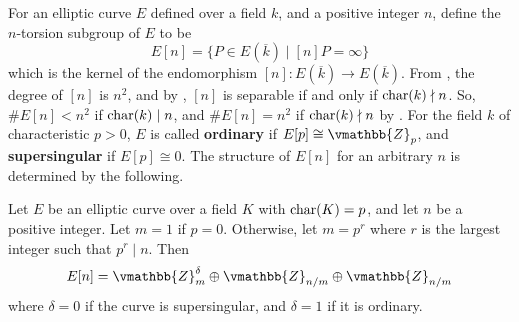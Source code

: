 For an elliptic curve $E$ defined over a field $k$, and a positive integer $n$, define the 
$n$-torsion subgroup of $E$ to be
$$
E[n] = \{ P \in E(\overline{k}) \mid [n]P = \infty\}
$$
which is the kernel of the endomorphism $[n]: E(\overline{k}) \rightarrow E(\overline{k})$. From 
, the degree of $[n]$ is $n^2$, and by 
, $[n]$ is separable if and only if $\operatorname{char}(k) \nmid n$. So, 
$\#E[n] < n^2$ if  $\operatorname{char}(k) \mid n$, and $\#E[n] = n^2$ if  $\operatorname{char}(k) \nmid n$ by 
. For the field $k$ of characteristic $p > 0$, $E$ is called 
\textbf{ordinary} if $E[p] \cong \vmathbb{Z}_p$, and \textbf{supersingular} if $E[p] \cong 0$. The 
structure of $E[n]$ for an arbitrary $n$ is determined by the following.
\begin{theorem}
\label{theorem:n-torsion-struct}
Let $E$ be an elliptic curve over a field $K$ with $\operatorname{char}(K) = p$, and let $n$ be a positive 
integer. Let $m = 1$ if $p = 0$. Otherwise, let $m = p^r$ where $r$ is the largest integer such that 
$p^r \mid n$. Then
$$
E[n] = \vmathbb{Z}_m^{\delta} \oplus \vmathbb{Z}_{n / m} \oplus \vmathbb{Z}_{n / m}
$$
where $\delta = 0$ if the curve is supersingular, and $\delta = 1$ if it is ordinary.
\end{theorem}
